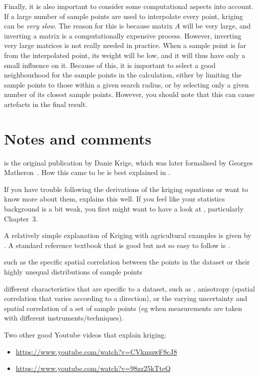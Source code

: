 Finally, it is also important to consider some computational aspects into account.
If a large number of sample points are used to interpolate every point, kriging can be \emph{very slow}.
The reason for this is because matrix \(A\) will be very large, and inverting a matrix is a computationally expensive process.
However, inverting very large matrices is not really needed in practice.
When a sample point is far from the interpolated point, its weight will be low, and it will thus have only a small influence on it.
Because of this, it is important to select a good neighbourhood for the sample points in the calculation, either by limiting the sample points to those within a given search radius, or by selecting only a given number of its closest sample points.
However, you should note that this can cause artefacts in the final result.

%
\section{Notes and comments}

\citet{Krige51} is the original publication by Danie Krige, which was later formalised by Georges Matheron~\citep{Matheron62,Matheron65}.
How this came to be is best explained in \citet{cressie93}.

If you have trouble following the derivations of the kriging equations or want to know more about them, \citet{Lichtenstern13} explains this well.
If you feel like your statistics background is a bit weak, you first might want to have a look at \citet{Fewster14}, particularly Chapter~3.

A relatively simple explanation of Kriging with agricultural examples is given by \citet{Oliver15}.
A standard reference textbook that is good but not so easy to follow is \citet{Wackernagel03}.

such as the specific spatial correlation between the points in the dataset or their highly unequal distributions of sample points


different characteristics that are specific to a dataset, such as , anisotropy (spatial correlation that varies according to a direction), or the varying uncertainty and spatial correlation of a set of sample points (eg when measurements are taken with different instruments/techniques).

Two other good Youtube videos that explain kriging:
\begin{itemize}
\item \url{https://www.youtube.com/watch?v=CVkmuwF8cJ8}
\item \url{https://www.youtube.com/watch?v=98zz25kTteQ}
\end{itemize}

